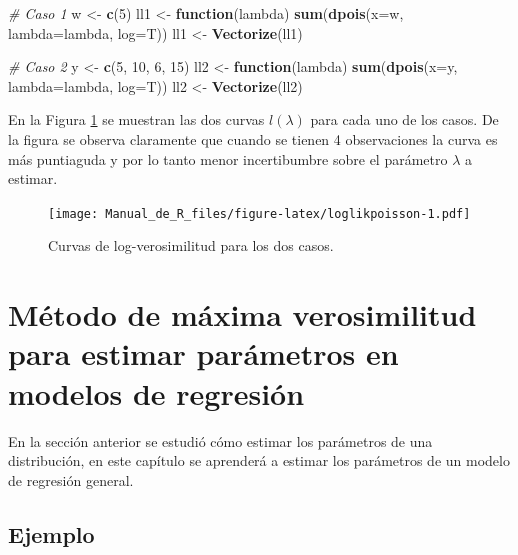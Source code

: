 \documentclass[10pt,]{krantz}
\makeatletter
\newenvironment{Shaded}{\begin{snugshade}}{\end{snugshade}}
\newcommand{\KeywordTok}[1]{\textcolor[rgb]{0.13,0.29,0.53}{\textbf{#1}}}
\newcommand{\DataTypeTok}[1]{\textcolor[rgb]{0.13,0.29,0.53}{#1}}
\newcommand{\DecValTok}[1]{\textcolor[rgb]{0.00,0.00,0.81}{#1}}
\newcommand{\StringTok}[1]{\textcolor[rgb]{0.31,0.60,0.02}{#1}}
\newcommand{\CommentTok}[1]{\textcolor[rgb]{0.56,0.35,0.01}{\textit{#1}}}
\newcommand{\ControlFlowTok}[1]{\textcolor[rgb]{0.13,0.29,0.53}{\textbf{#1}}}
\newcommand{\NormalTok}[1]{#1}
\newenvironment{kframe}{%
\medskip{}
\setlength{\fboxsep}{.8em}
 \def\at@end@of@kframe{}%
 \ifinner\ifhmode%
  \def\at@end@of@kframe{\end{minipage}}%
  \begin{minipage}{\columnwidth}%
 \fi\fi%
 \def\FrameCommand##1{\hskip\@totalleftmargin \hskip-\fboxsep
 \colorbox{shadecolor}{##1}\hskip-\fboxsep
     \hskip-\linewidth \hskip-\@totalleftmargin \hskip\columnwidth}%
 \MakeFramed {\advance\hsize-\width
   \@totalleftmargin\z@ \linewidth\hsize
   \@setminipage}}%
 {\par\unskip\endMakeFramed%
 \at@end@of@kframe}
\renewenvironment{Shaded}{\begin{kframe}}{\end{kframe}}
\makeatother
\begin{document}
\begin{Shaded}
\begin{Highlighting}[]
\CommentTok{# Caso 1}
\NormalTok{w <-}\StringTok{ }\KeywordTok{c}\NormalTok{(}\DecValTok{5}\NormalTok{)}
\NormalTok{ll1 <-}\StringTok{ }\ControlFlowTok{function}\NormalTok{(lambda) }\KeywordTok{sum}\NormalTok{(}\KeywordTok{dpois}\NormalTok{(}\DataTypeTok{x=}\NormalTok{w, }\DataTypeTok{lambda=}\NormalTok{lambda, }\DataTypeTok{log=}\NormalTok{T))}
\NormalTok{ll1 <-}\StringTok{ }\KeywordTok{Vectorize}\NormalTok{(ll1)}

\CommentTok{# Caso 2}
\NormalTok{y <-}\StringTok{ }\KeywordTok{c}\NormalTok{(}\DecValTok{5}\NormalTok{, }\DecValTok{10}\NormalTok{, }\DecValTok{6}\NormalTok{, }\DecValTok{15}\NormalTok{)}
\NormalTok{ll2 <-}\StringTok{ }\ControlFlowTok{function}\NormalTok{(lambda) }\KeywordTok{sum}\NormalTok{(}\KeywordTok{dpois}\NormalTok{(}\DataTypeTok{x=}\NormalTok{y, }\DataTypeTok{lambda=}\NormalTok{lambda, }\DataTypeTok{log=}\NormalTok{T))}
\NormalTok{ll2 <-}\StringTok{ }\KeywordTok{Vectorize}\NormalTok{(ll2)}
\end{Highlighting}
\end{Shaded}

En la Figura \ref{fig:loglikpoisson} se muestran las dos curvas
\(l(\lambda)\) para cada uno de los casos. De la figura se observa
claramente que cuando se tienen 4 observaciones la curva es más
puntiaguda y por lo tanto menor incertibumbre sobre el parámetro
\(\lambda\) a estimar.

\begin{figure}
\centering
\texttt{[image: Manual\_de\_R\_files/figure-latex/loglikpoisson-1.pdf]}
\caption{\label{fig:loglikpoisson}Curvas de log-verosimilitud para los dos
casos.}
\end{figure}

\section{Método de máxima verosimilitud para estimar parámetros en
modelos de
regresión}\label{metodo-de-maxima-verosimilitud-para-estimar-parametros-en-modelos-de-regresion}

En la sección anterior se estudió cómo estimar los parámetros de una
distribución, en este capítulo se aprenderá a estimar los parámetros de
un modelo de regresión general.

\subsection*{Ejemplo}\label{ejemplo-54}
\end{document}
